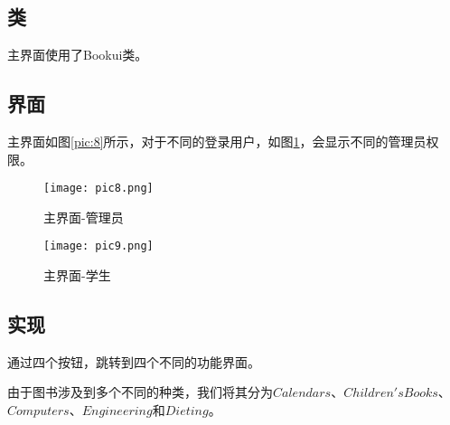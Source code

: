 \documentclass[forprint]{shmtu}
\begin{document}
\subsection{类}

主界面使用了Bookui类。

\subsection{界面}

主界面如图\ref{pic:8}所示，对于不同的登录用户，如图\ref{pic:9}，会显示不同的管理员权限。

\begin{figure}[!htbp]
	\centering
	\begin{minipage}[!htbp]{0.45\linewidth}
		\centering
		\texttt{[image: pic8.png]}
		\caption{主界面-管理员}
		\label{pic:8}
	\end{minipage}%
	\begin{minipage}[!htbp]{0.45\linewidth}
		\centering
		\texttt{[image: pic9.png]}
		\caption{主界面-学生}
		\label{pic:9}
	\end{minipage}%
\end{figure}

\subsection{实现}

通过四个按钮，跳转到四个不同的功能界面。

由于图书涉及到多个不同的种类，我们将其分为$Calendars$、$Children's Books$、$Computers$、$Engineering$和$Dieting$。
\end{document}

